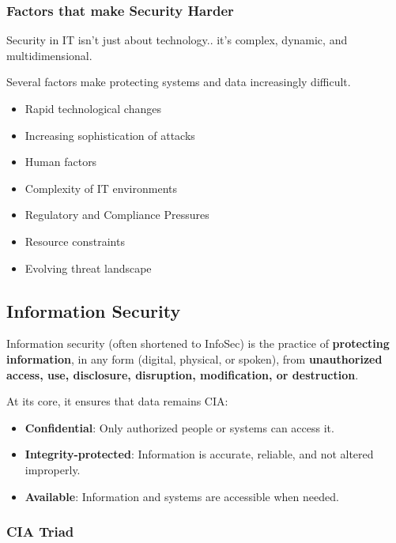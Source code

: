 \subsubsection{Factors that make Security Harder}

\indent 

Security in IT isn’t just about technology.. it’s complex, dynamic, and multidimensional. 

Several factors make protecting systems and data increasingly difficult.

\begin{itemize}
    \item Rapid technological changes
    \item Increasing sophistication of attacks
    \item Human factors
    \item Complexity of IT environments
    \item Regulatory and Compliance Pressures
    \item Resource constraints
    \item Evolving threat landscape
\end{itemize}

\subsection{Information Security}

\indent 

Information security (often shortened to InfoSec) is the practice of \textbf{protecting information}, in any form (digital, physical, or spoken), from \textbf{unauthorized access, use, disclosure, disruption, modification, or destruction}.

At its core, it ensures that data remains CIA:

\begin{itemize}
    \item \textbf{Confidential}: Only authorized people or systems can access it.
    \item \textbf{Integrity-protected}: Information is accurate, reliable, and not altered improperly.
    \item \textbf{Available}: Information and systems are accessible when needed.
\end{itemize}

\subsubsection{CIA Triad}

